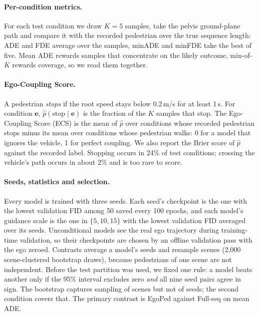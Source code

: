 \documentclass{ieeeoj}
\newcommand{\method}{EgoPed\xspace}
\newcommand{\fullseq}{Full-seq\xspace}
\begin{document}
\paragraph{Per-condition metrics.}
For each test condition we draw $K{=}5$ samples, take the pelvis ground-plane path and compare it with the recorded pedestrian over the true sequence length: ADE and FDE average over the samples, minADE and minFDE take the best of five. Mean ADE rewards samples that concentrate on the likely outcome, min-of-$K$ rewards coverage, so we read them together.

\paragraph{Ego-Coupling Score.}
\label{sec:behavior}
A pedestrian \emph{stops} if the root speed stays below 0.2\,m/s for at least 1\,s. For condition $\mathbf{e}$, $\hat{p}(\mathrm{stop}\mid\mathbf{e})$ is the fraction of the $K$ samples that stop. The Ego-Coupling Score (ECS) is the mean of $\hat{p}$ over conditions whose recorded pedestrian stops minus its mean over conditions whose pedestrian walks: 0 for a model that ignores the vehicle, 1 for perfect coupling. We also report the Brier score of $\hat{p}$ against the recorded label. Stopping occurs in 24\% of test conditions; crossing the vehicle's path occurs in about 2\% and is too rare to score.

\paragraph{Seeds, statistics and selection.}
Every model is trained with three seeds. Each seed's checkpoint is the one with the lowest validation FID among 50 saved every 100 epochs, and each model's guidance scale is the one in $\{5, 10, 15\}$ with the lowest validation FID averaged over its seeds. Unconditional models see the real ego trajectory during training-time validation, so their checkpoints are chosen by an offline validation pass with the ego zeroed.
Contrasts average a model's seeds and resample scenes (2{,}000 scene-clustered bootstrap draws), because pedestrians of one scene are not independent. Before the test partition was used, we fixed one rule: a model beats another only if the 95\% interval excludes zero \emph{and} all nine seed pairs agree in sign. The bootstrap captures sampling of scenes but not of seeds; the second condition covers that. The primary contrast is \method against \fullseq on mean ADE.

\end{document}
